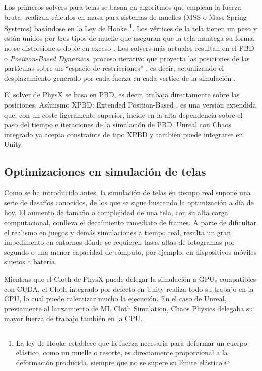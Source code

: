 Los primeros solvers para telas se basan en algoritmos que emplean la fuerza bruta: realizan cálculos en masa para sistemas de muelles (MSS o Mass Spring Systems) basándose en la Ley de Hooke \footnote{La ley de Hooke establece que la fuerza necesaria para deformar un cuerpo elástico, como un muelle o resorte, es directamente proporcional a la deformación producida, siempre que no se supere su límite elástico. }. Los vértices de la tela tienen un peso y están unidos por tres tipos de muelle que aseguran que la tela mantega su forma, no se distorsione o doble en exceso \cite{provot}. Los solvers más actuales resultan en el PBD o \textit{Position-Based Dynamics}, proceso iterativo que proyecta las posiciones de las partículas sobre un ``espacio de restricciones'' \cite{muller_position_2007}, es decir, actualizando el desplazamiento generado por cada fuerza en cada vertice de la simulación \cite{chaudhary2025towards}.\newline

El solver de PhysX se basa en PBD, es decir, trabaja directamente sobre las posiciones. Asímismo XPBD: Extended Position-Based \cite{macklin_xpbd_2016}, es una versión extendida que, con un coste ligeramente superior, incide en la alta dependencia sobre el paso del tiempo e iteraciones de la simulación de PBD. Unreal con Chaos integrado ya acepta constraints de tipo XPBD y también puede integrarse en Unity.


\subsection{Optimizaciones en simulación de telas}
\label{subsec:optimtelas}
Como se ha introducido antes, la simulación de telas en tiempo real supone una serie de desafíos conocidos, de los que se sigue buscando la optimización a día de hoy. El aumento de tamaño o complejidad de una tela, con su alta carga computacional, conlleva el decaímiento inmediato de frames. A parte de dificultar el realismo en juegos y demás simulaciones a tiempo real, resulta un gran impedimento en entornos dónde se requieren tasas altas de fotogramas por segundo o una menor capacidad de cómputo, por ejemplo, en dispositivos móviles sujetos a batería.\newline

Mientras que el Cloth de PhysX puede delegar la simulación a GPUs compatibles con CUDA, el Cloth integrado por defecto en Unity realiza todo su trabajo en la CPU, lo cual puede ralentizar mucho la ejecución. En el caso de Unreal, previamente al lanzamiento de ML Cloth Simulation, Chaos Physics delegaba su mayor fuerza de trabajo también en la CPU. \newline

